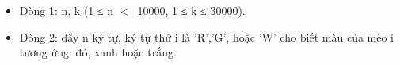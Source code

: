 \begin{itemize}
	\item Dòng 1: n, k (1 ≤ n $<$ 10000, 1 ≤ k ≤ 30000).
	\item Dòng 2: dãy n ký tự, ký tự thứ i là 'R','G', hoặc 'W' cho biết màu của mèo i tương ứng: đỏ, xanh hoặc trắng.
\end{itemize}